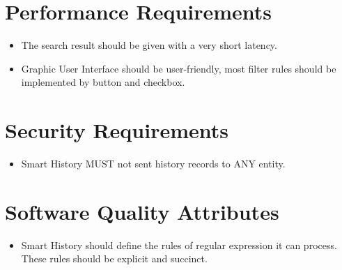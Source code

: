 \documentclass[a5paper]{scrreprt}
\begin{document}
\section{Performance Requirements}

\begin{itemize}[label=\checkmark]
	\item The search result should be given with a very short latency.
	\item Graphic User Interface should be user-friendly, most filter rules 
		should be implemented by button and checkbox.
\end{itemize}

\section{Security Requirements}

\begin{itemize}[label=\checkmark]
	\item Smart History MUST not sent history records to ANY entity.
\end{itemize}

\section{Software Quality Attributes}

\begin{itemize}[label=\checkmark]
	\item Smart History should define the rules of regular expression it can 
		process. These rules should be explicit and succinct.
\end{itemize}
\end{document}
